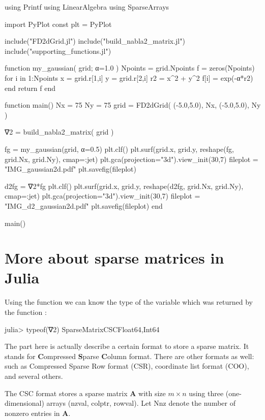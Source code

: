 \begin{juliacode}
using Printf
using LinearAlgebra
using SparseArrays
    
import PyPlot
const plt = PyPlot
    
include("FD2dGrid.jl")
include("build_nabla2_matrix.jl")
include("supporting_functions.jl")
    
function my_gaussian( grid; α=1.0 )
    Npoints = grid.Npoints
    f = zeros(Npoints)
    for i in 1:Npoints
        x = grid.r[1,i]
        y = grid.r[2,i]
        r2 = x^2 + y^2
        f[i] = exp(-α*r2)
    end
    return f
end
    
function main()  
    Nx = 75
    Ny = 75
    grid = FD2dGrid( (-5.0,5.0), Nx, (-5.0,5.0), Ny )
    
    ∇2 = build_nabla2_matrix( grid )
    
    fg = my_gaussian(grid, α=0.5)
    plt.clf()
    plt.surf(grid.x, grid.y, reshape(fg, grid.Nx, grid.Ny), cmap=:jet)
    plt.gca(projection="3d").view_init(30,7)
    fileplot = "IMG_gaussian2d.pdf"
    plt.savefig(fileplot)
    
    d2fg = ∇2*fg    
    plt.clf()
    plt.surf(grid.x, grid.y, reshape(d2fg, grid.Nx, grid.Ny), cmap=:jet)
    plt.gca(projection="3d").view_init(30,7)    
    fileplot = "IMG_d2_gaussian2d.pdf"
    plt.savefig(fileplot)
end
    
main()    
\end{juliacode}


\section{More about sparse matrices in Julia}

Using the function  we can know the type of the variable
 which was returned by the function :
\begin{textcode}
julia> typeof(∇2)
SparseMatrixCSC{Float64,Int64}  
\end{textcode}
The  part here is actually describe a certain format to store
a sparse matrix. It stands for \textbf{C}ompressed \textbf{S}parse \textbf{C}olumn
format. There are other formats as well: such as Compressed Sparse Row format (CSR),
coordinate list format (COO), and several others.

The CSC format stores a sparse matrix $\mathbf{A}$ with size $m \times n$
using three (one-dimensional) arrays (nzval, colptr, rowval).
Let Nnz denote the number of nonzero entries in $\mathbf{A}$.

